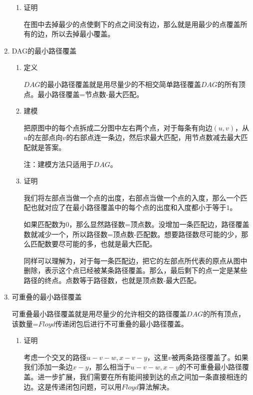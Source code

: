 \documentclass[11pt]{article}
\begin{document}
\begin{enumerate}
\begin{enumerate}
\item 证明
\label{sec:org177c5c1}

在图中去掉最少的点使剩下的点之间没有边，那么就是用最少的点覆盖所有的边，所以去掉最小覆盖。
\end{enumerate}

\item DAG的最小路径覆盖
\label{sec:org3d38833}

\begin{enumerate}
\item 定义
\label{sec:orge6b9951}

\(DAG\)的最小路径覆盖就是用尽量少的不相交简单路径覆盖\(DAG\)的所有顶点。最小路径覆盖=节点数-最大匹配。

\item 建模
\label{sec:org23c0736}

把原图中的每个点拆成二分图中左右两个点，对于每条有向边\((u,v)\)，从\(u\)的左部点向\(v\)的右部点连一条边，然后求最大匹配，用节点数减去最大匹配就是答案。

注：建模方法只适用于\(DAG\)。

\item 证明
\label{sec:org9c15f48}

我们将左部点当做一个点的出度，右部点当做一个点的入度，那么一个匹配也就对应了在最小路径覆盖中的每个点的出度和入度都小于等于\(1\)。

如果匹配数为\(0\)，那么显然路径数=顶点数。没增加一条匹配边，路径覆盖数就减少一个，所以路径数=顶点数-匹配数。想要路径数尽可能的少，那么匹配数要尽可能的多，也就是最大匹配。

同样可以理解为，对于每一条匹配边，把它的左部点所代表的原点从图中删除，表示这个点已经被某条路径覆盖。那么，最后剩下的点一定是某些路径的终点。点数等于路径数，也就是顶点数-最大匹配。
\end{enumerate}

\item 可重叠的最小路径覆盖
\label{sec:orga1e4335}

可重叠最小路径覆盖就是用尽量少的允许相交的路径覆盖\(DAG\)的所有顶点，该数量=\(Floyd\)传递闭包后进行不可重叠的最小路径覆盖。

\begin{enumerate}
\item 证明
\label{sec:org2f8b24b}

考虑一个交叉的路径\(u-v-w,x-v-y\)，这里\(v\)被两条路径覆盖了。如果我们添加一条边\(x-y\)，那么相当于\(u-v-w,x-y\)的不可重叠最小路径覆盖。进一步扩展，我们需要在所有能间接到达的点之间加一条直接相连的边。这是传递闭包问题，可以用\(Floyd\)算法解决。
\end{enumerate}
\end{enumerate}
\end{document}
